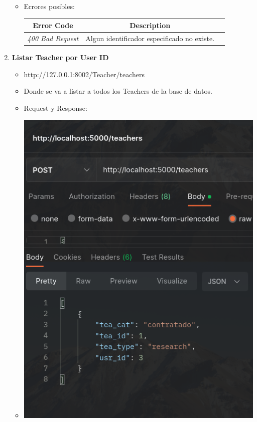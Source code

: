 \documentclass{article}
\begin{document}
\begin{enumerate}
\begin{itemize}
        \item Errores posibles: \begin{table}[H] \centering
        \begin{tabular}{|c|c|l|} \hline \textbf{Error Code} &
        \textbf{Description} \\ \hline \textit{400 Bad Request} & Algun
        identificador especificado no existe. \\ \hline \end{tabular}
        \end{table} 
    \end{itemize}

    \item \textbf{Listar Teacher por User ID}
    \begin{itemize}
        \item http://127.0.0.1:8002/Teacher/teachers
        \item Donde se va a listar a todos los Teachers de la base de
        datos.
        \item Request y Response:
        \item \includegraphics[scale=.5]{assets/teacher/teachers.png}

\end{itemize}
\end{enumerate}
\end{document}
